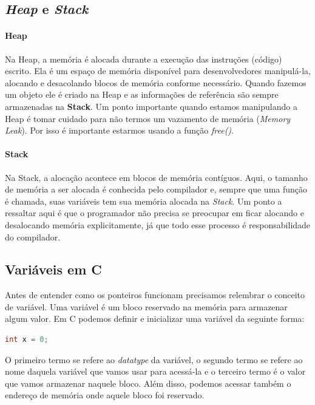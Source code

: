\subsection{\textit{Heap} e \textit{Stack}}

\paragraph{Heap} Na Heap, a memória é alocada durante a execução das instruções (código) escrito.
Ela é um espaço de memória disponível para desenvolvedores manipulá-la, alocando e desacolando
blocos de memória conforme necessário. Quando fazemos um objeto ele é criado na Heap e as
informações de referência são sempre armazenadas na \textbf{Stack}. Um ponto importante quando
estamos manipulando a Heap é tomar cuidado para não termos um vazamento de memória (\textit{Memory
Leak}). Por isso é importante estarmos usando a função \textit{free()}.

\paragraph{Stack} Na Stack, a alocação acontece em blocos de memória contíguos. Aqui, o tamanho de
memória a ser alocada é conhecida pelo compilador e, sempre que uma função é chamada, suas variáveis
tem sua memória alocada na \textit{Stack}. Um ponto a ressaltar aqui é que o programador não precisa
se preocupar em ficar alocando e desalocando memória explicitamente, já que todo esse processo é
responsabilidade do compilador.
\subsection{Variáveis em C}

Antes de entender como os ponteiros funcionam precisamos relembrar o conceito de variável.
Uma variável é um bloco reservado na memória para armazenar algum valor. Em C podemos definir e inicializar
uma variável da seguinte forma:

\begin{lstlisting}[language=C]
int x = 0;
\end{lstlisting}

O primeiro termo se refere ao \textit{datatype} da variável, o segundo termo se refere ao nome daquela
variável que vamos usar para acessá-la e o terceiro termo é o valor que vamos armazenar naquele bloco. Além disso, podemos acessar também o endereço de memória onde
aquele bloco foi reservado.

